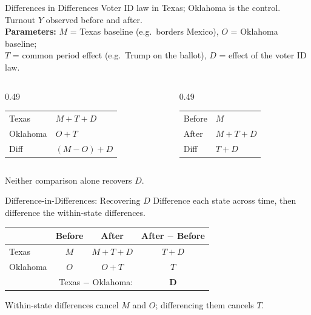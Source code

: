 \documentclass[aspectratio=169, handout]{beamer}
\numberwithin{equation}{section}
\begin{document}
\begin{frame}{Differences in Differences}
Voter ID law in Texas; Oklahoma is the control. Turnout $Y$ observed before and after.\\[4pt]
\textbf{Parameters:} $M$ = Texas baseline (e.g.\ borders Mexico), $O$ = Oklahoma baseline;\\
$T$ = common period effect (e.g.\ Trump on the ballot), $D$ = effect of the voter ID law.\pause

\vspace{6pt}
\begin{columns}[T]
\begin{column}{0.49\textwidth}
\begin{tcolorbox}[colback=blue!8, colframe=blue, title=Cross-section (after)]
\centering
\begin{tabular}{l@{\quad}l}
Texas & $M+T+D$\\
Oklahoma & $O+T$\\
\midrule
Diff & $(M-O)+D$
\end{tabular}
\end{tcolorbox}
\end{column}
\begin{column}{0.49\textwidth}
\begin{tcolorbox}[colback=darkgreen!8, colframe=darkgreen, title=Time-series (Texas)]
\centering
\begin{tabular}{l@{\quad}l}
Before & $M$\\
After & $M+T+D$\\
\midrule
Diff & $T+D$
\end{tabular}
\end{tcolorbox}
\end{column}
\end{columns}
\pause\vspace{6pt}

\centering Neither comparison alone recovers $D$.
\end{frame}


\begin{frame}{Difference-in-Differences: Recovering $D$}
Difference each state across time, then difference the within-state differences.\\[4pt]

\begin{tcolorbox}[colback=darkpurple!6, colframe=darkpurple, title=Difference-in-Differences]
\centering
\begin{tabular}{l@{\quad}ccc}
 & Before & After & After $-$ Before\\
\midrule
Texas & $M$ & $M+T+D$ & $T+D$\\
Oklahoma & $O$ & $O+T$ & $T$\\
\midrule
\multicolumn{3}{r}{Texas $-$ Oklahoma:} & $\bm{D}$\\
\end{tabular}
\end{tcolorbox}

\vspace{6pt}
\centering Within-state differences cancel $M$ and $O$; differencing them cancels $T$.
\end{frame}
\end{document}
